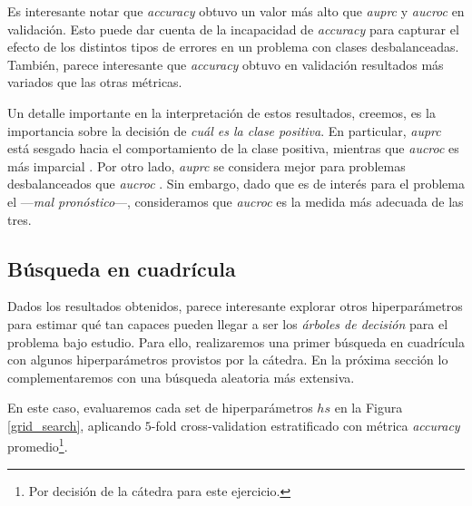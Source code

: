 Es interesante notar que \textit{accuracy} obtuvo un valor más alto que \textit{auprc} y \textit{aucroc} en validación. Esto puede dar cuenta de la incapacidad de \textit{accuracy} para capturar el efecto de los distintos tipos de errores en un problema con clases desbalanceadas. También, parece interesante que \textit{accuracy} obtuvo en validación resultados más variados que las otras métricas. 

Un detalle importante en la interpretación de estos resultados, creemos, es la importancia sobre la decisión de \textit{cuál es la clase positiva}. En particular, \textit{auprc} está sesgado hacia el comportamiento de la clase positiva, mientras que \textit{aucroc} es más imparcial \cite{Saito}. Por otro lado, \textit{auprc} se considera mejor para problemas desbalanceados que \textit{aucroc} \cite{Saito}. Sin embargo, dado que es de interés para el problema el ---\textit{mal pronóstico}---, consideramos que \textit{aucroc} es la medida más adecuada de las tres.

\subsection{Búsqueda en cuadrícula}

Dados los resultados obtenidos, parece interesante explorar otros hiperparámetros para estimar qué tan capaces pueden llegar a ser los \textit{árboles de decisión} para el problema bajo estudio. Para ello, realizaremos una primer búsqueda en cuadrícula con algunos hiperparámetros provistos por la cátedra. En la próxima sección lo complementaremos con una búsqueda aleatoria más extensiva.

En este caso, evaluaremos cada set de hiperparámetros $hs$ en la Figura \ref{grid_search}, aplicando $5$-fold cross-validation estratificado con métrica \textit{accuracy} promedio\footnote{Por decisión de la cátedra para este ejercicio.}.

